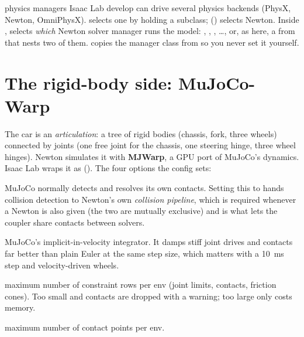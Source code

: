 \begin{isaacbox}{physics managers}
Isaac Lab develop can drive several physics backends (PhysX, Newton,
OmniPhysX).  selects one by holding a
 subclass; 
()
selects Newton. Inside ,  selects
\emph{which} Newton solver manager runs the model: ,
, , \ldots, or, as here, a
 from  that nests two of
them.  copies the manager class from
 so you never set it yourself.
\end{isaacbox}

\section{The rigid-body side: MuJoCo-Warp}

The car is an \emph{articulation}: a tree of rigid bodies (chassis, fork,
three wheels) connected by joints (one free joint for the chassis, one steering
hinge, three wheel hinges). Newton simulates it with \textbf{MJWarp}, a
GPU port of MuJoCo's dynamics. Isaac Lab wraps it as 
(). The four options the config sets:

\begin{description}[leftmargin=1.6em,font=\ttfamily]
  \item[use\_mujoco\_contacts=False] MuJoCo normally detects and resolves its
    own contacts. Setting this to  hands collision detection to
    Newton's own \emph{collision pipeline}, which is required whenever a
    Newton  is also given (the two are mutually
    exclusive) and is what lets the coupler share contacts between solvers.
  \item[integrator="implicitfast"] MuJoCo's implicit-in-velocity integrator.
    It damps stiff joint drives and contacts far better than plain Euler at
    the same step size, which matters with a 10~ms step and velocity-driven
    wheels.
  \item[njmax=128] maximum number of constraint rows per env (joint limits,
    contacts, friction cones). Too small and contacts are dropped with a
    warning; too large only costs memory.
  \item[nconmax=128] maximum number of contact points per env.
\end{description}

